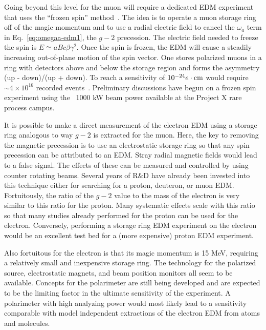 Going beyond this level for the muon will require a dedicated EDM experiment that
uses
the ``frozen spin'' method~\cite{Farley04,Roberts2010}.
 The idea is to operate a
muon storage ring off of the  magic momentum and to use a radial electric field
to cancel the $\omega_a$ term in Eq.~\ref{eq:omegaa-edm1},
 the $g-2$ precession.  The  electric field needed to freeze the spin is
$E \simeq aBc\beta\gamma^2$.
Once the spin is frozen, the EDM will cause a steadily increasing
out-of-plane motion of the spin vector. One stores polarized muons in a ring
with detectors above and below the storage region and forms the asymmetry
(up - down)/(up + down).  To reach a sensitivity of $10^{-24}e \cdot {\rm cm}$ would
require $\sim 4 \times 10^{16}$ recorded events~\cite{Farley04}.
 Preliminary discussions have begun on a frozen spin experiment
using the ~1000 kW beam power available at the Project X rare process campus.
  
It is possible to make a direct measurement of the electron EDM using a storage ring analogous to way $g-2$ is extracted for the muon.  
Here, the key to removing the magnetic precession is to use an electrostatic storage ring so that any spin precession can be attributed to an EDM.  Stray radial magnetic fields 
would lead to a false signal.  The effects of these can be measured and controlled by using counter rotating beams. Several years of 
R$\&$D have already been invested into this technique either for searching for a proton, deuteron, or muon EDM.  Fortuitously, the ratio
 of the $g-2$ value to the mass of the electron is very similar to this ratio for the proton.  Many systematic effects scale with this ratio so 
 that many studies already performed for the proton can be used for the electron.  Conversely, performing a storage ring EDM 
 experiment on the electron would be an excellent test bed for a (more expensive) proton EDM experiment.
 
 Also fortuitous for the electron is that its magic momentum is 15 MeV, requiring a relatively small and inexpensive storage ring.  The technology for the polarized source,
  electrostatic magnets, and beam position monitors all seem to be available.  Concepts for the polarimeter are still being 
  developed and are expected to be the limiting factor in the ultimate sensitivity of the experiment.  A polarimeter with high 
  analyzing power would most likely lead to a sensitivity comparable with model independent extractions of the electron 
  EDM from atoms and molecules.



